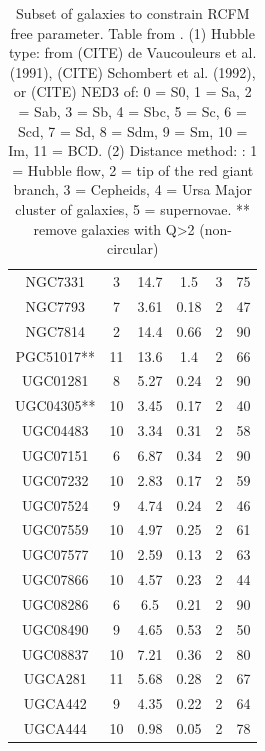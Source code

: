 \documentclass[reprint,%
 amsmath,amssymb,
 aps,
]{revtex4-1}
\begin{document}
\begin{table}[]
\begin{tabular}{|c|c|c|c|c|c|}
NGC7331& 	3& 	14.7& 	1.5&    	3& 	75\\
NGC7793& 	7& 	3.61& 	0.18&   	2& 	47\\
NGC7814& 	2&  	14.4& 	0.66& 	2& 	90\\
PGC51017**& 	11& 	13.6& 	1.4& 	2& 	66\\
UGC01281& 	8&   	5.27& 	0.24& 	2& 	90\\
UGC04305**& 	10& 	3.45& 	0.17& 	2& 	40\\
UGC04483& 	10& 	3.34& 	0.31& 	2& 	58\\
UGC07151& 	6& 	6.87& 	0.34&   	2& 	90\\
UGC07232& 	10& 	2.83& 	0.17& 	2& 	59\\
UGC07524& 	9& 	4.74& 	0.24& 	    2& 	46\\
UGC07559& 	10& 	4.97& 	0.25& 	2& 	61\\
UGC07577& 	10& 	2.59& 	0.13& 	2& 	63\\
UGC07866& 	10& 	4.57& 	0.23& 	2& 	44\\
UGC08286& 	6& 	6.5& 	0.21&   	2& 	90\\
UGC08490& 	9& 	4.65& 	0.53&   	2& 	50\\
UGC08837& 	10& 	7.21& 	0.36& 	2& 	80\\
UGCA281& 	11& 	5.68& 	0.28& 	2& 	67\\
UGCA442& 	9& 	4.35& 	0.22& 	    2& 	64\\
UGCA444& 	10& 	0.98& 	0.05& 	2& 	78\\
    \hline \hline           
      \end{tabular}
      \caption{Subset of galaxies to constrain RCFM free parameter.  Table from  \citet{2016Lelli}. 
      (1) Hubble type:  from (CITE) de
Vaucouleurs et al. (1991), (CITE) Schombert et al. (1992), or (CITE) NED3
of: 0 = S0, 1 = Sa, 2 = Sab,
3 = Sb, 4 = Sbc, 5 = Sc, 6 = Scd, 7 = Sd, 8 = Sdm,
9 = Sm, 10 = Im, 11 = BCD.  (2) Distance method: : 1 = Hubble flow,
2 = tip of the red giant branch, 3 = Cepheids, 4 = Ursa Major
cluster of galaxies, 5 = supernovae. ** remove galaxies with Q>2 (non-circular)}
   \label{tab:Tset}
  \end{table}
  
 
\end{document}
